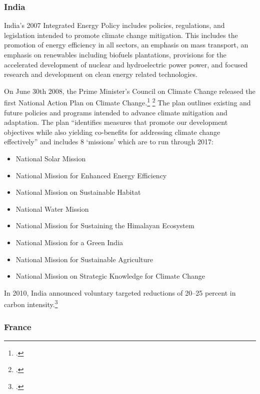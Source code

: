 \documentclass[10pt]{article}
\begin{document}
	\subsubsection{India}






India's 2007 Integrated Energy Policy includes policies, regulations, and legislation intended to promote climate change mitigation.
This includes the promotion of energy efficiency in all sectors, an emphasis on mass transport, an emphasis on renewables including biofuels plantations, provisions for the accelerated development of nuclear and hydroelectric power power, and focused research and development on clean energy related technologies.




On June 30th 2008, the Prime Minister's Council on Climate Change released the first National Action Plan on Climate Change.\footcite[][]{IndiaPlan2008} \footcite[See also: ][]{IndiaActionSummary}
The plan outlines existing and future policies and programs intended to advance climate mitigation and adaptation. 
The plan ``identifies measures that promote our development objectives while also yielding co-benefits for addressing climate change effectively'' and includes 8 `missions' which are to run through 2017:
\begin{itemize}
	\item National Solar Mission 
	\item National Mission for Enhanced Energy Efficiency
	\item National Mission on Sustainable Habitat
	\item National Water Mission
	\item National Mission for Sustaining the Himalayan Ecosystem
	\item National Mission for a Green India
	\item National Mission for Sustainable Agriculture
	\item National Mission on Strategic Knowledge for Climate Change
\end{itemize}
In 2010, India announced voluntary targeted reductions of 20--25 percent in carbon intensity.\footcite[][p. 108]{UNHumanDev2013}



	\subsubsection{France}
	
\end{document}
